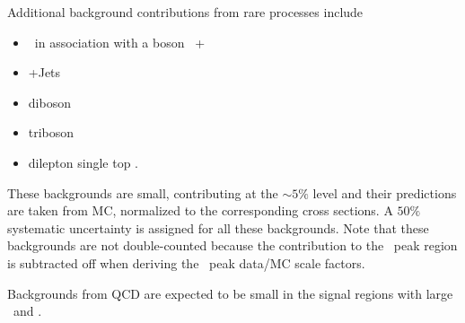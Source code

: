 Additional background contributions from rare processes include
\begin{itemize}
\item  \ttbar\ in association with a boson \ttbar\ + \W\/\dy\ \\
\item \dy+Jets \\
\item diboson \vv\ \\
\item triboson \vvv\ \\
\item dilepton single top \tw. \\
\end{itemize}
These backgrounds are small, contributing at the $\sim 5\%$ level and their predictions are taken 
from MC, normalized to the corresponding cross sections. A $50\%$ systematic uncertainty is 
assigned for all these backgrounds.
Note that these backgrounds are not double-counted because the contribution to the \mt\ peak region
is subtracted off when deriving the \mt\ peak data/MC scale factors. %


Backgrounds from QCD are expected to be small in the signal regions with large \mt\ and \met.
